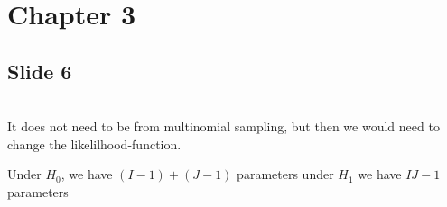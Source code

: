 \section{Chapter 3}
\subsection{Slide 6}\hfill\\
\noindent It does not need to be from multinomial sampling, but then we would need to change the likelilhood-function.\par
\noindent Under $H_0$, we have $(I-1)+(J-1)$ parameters under $H_1$ we have $IJ-1$ parameters
\par\bigskip
